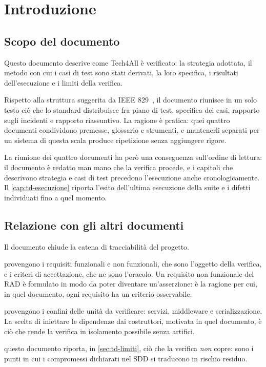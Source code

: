 \chapter{Introduzione}
\label{cap:td-introduzione}

\section{Scopo del documento}

Questo documento descrive come Tech4All è verificato: la strategia adottata,
il metodo con cui i casi di test sono stati derivati, la loro specifica, i
risultati dell'esecuzione e i limiti della verifica.

Rispetto alla struttura suggerita da IEEE 829~\cite{ieee829}, il documento
riunisce in un solo testo ciò che lo standard distribuisce fra piano di test,
specifica dei casi, rapporto sugli incidenti e rapporto riassuntivo. La
ragione è pratica: quei quattro documenti condividono premesse, glossario e
strumenti, e mantenerli separati per un sistema di questa scala produce
ripetizione senza aggiungere rigore.

La riunione dei quattro documenti ha però una conseguenza sull'ordine di
lettura: il documento è redatto man mano che la verifica procede, e i
capitoli che descrivono strategia e casi di test precedono l'esecuzione
anche cronologicamente. Il \cref{cap:td-esecuzione} riporta l'esito
dell'ultima esecuzione della suite e i difetti individuati fino a quel
momento.

\section{Relazione con gli altri documenti}

Il documento chiude la catena di tracciabilità del progetto.

\begin{description}[leftmargin=1.4cm,style=nextline]
  \item[Dal RAD] provengono i requisiti funzionali e non funzionali, che sono
    l'oggetto della verifica, e i criteri di accettazione, che ne sono
    l'oracolo. Un requisito non funzionale del RAD è formulato in modo da
    poter diventare un'asserzione: è la ragione per cui, in quel documento,
    ogni requisito ha un criterio osservabile.
  \item[Dal SDD] provengono i confini delle unità da verificare: servizi,
    middleware e serializzazione. La scelta di iniettare le dipendenze dai
    costruttori, motivata in quel documento, è ciò che rende la verifica in
    isolamento possibile senza artifici.
  \item[Verso entrambi] questo documento riporta, in
    \cref{sec:td-limiti}, ciò che la verifica \emph{non} copre: sono i punti
    in cui i compromessi dichiarati nel SDD si traducono in rischio residuo.
\end{description}

